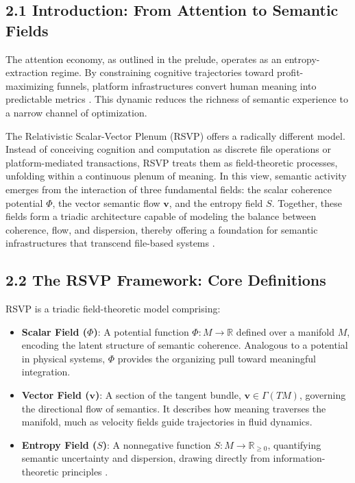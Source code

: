 \documentclass[12pt]{article}
\begin{document}
\subsection*{2.1 Introduction: From Attention to Semantic Fields}

The attention economy, as outlined in the prelude, operates as an entropy-extraction 
regime. By constraining cognitive trajectories toward profit-maximizing funnels, 
platform infrastructures convert human meaning into predictable metrics 
\citep{zuboff2019, lanier2018}. This dynamic reduces the richness of semantic experience 
to a narrow channel of optimization. 

The Relativistic Scalar-Vector Plenum (RSVP) offers a radically different model. 
Instead of conceiving cognition and computation as discrete file operations or 
platform-mediated transactions, RSVP treats them as field-theoretic processes, 
unfolding within a continuous plenum of meaning. In this view, semantic activity 
emerges from the interaction of three fundamental fields: the scalar coherence 
potential \(\Phi\), the vector semantic flow \(\mathbf{v}\), and the entropy field \(S\). 
Together, these fields form a triadic architecture capable of modeling the balance 
between coherence, flow, and dispersion, thereby offering a foundation for semantic 
infrastructures that transcend file-based systems \citep{bird1988, gromov1999, baez2011}. 

\subsection*{2.2 The RSVP Framework: Core Definitions}

RSVP is a triadic field-theoretic model comprising:
\begin{itemize}
    \item \textbf{Scalar Field (\(\Phi\))}: A potential function \(\Phi : M \to \mathbb{R}\) defined 
    over a manifold \(M\), encoding the latent structure of semantic coherence. Analogous 
    to a potential in physical systems, \(\Phi\) provides the organizing pull toward 
    meaningful integration.
    \item \textbf{Vector Field (\(\mathbf{v}\))}: A section of the tangent bundle, 
    \(\mathbf{v} \in \Gamma(TM)\), governing the directional flow of semantics. It 
    describes how meaning traverses the manifold, much as velocity fields guide 
    trajectories in fluid dynamics.
    \item \textbf{Entropy Field (\(S\))}: A nonnegative function \(S : M \to \mathbb{R}_{\geq 0}\), 
    quantifying semantic uncertainty and dispersion, drawing directly from 
    information-theoretic principles \citep{shannon1948}.
\end{itemize}
\end{document}
